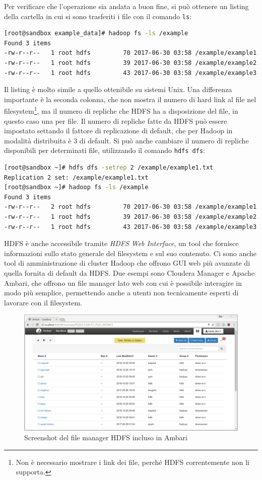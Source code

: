 \documentclass[italian,a4paper, twoside, 12pt]{report}
\begin{document}
Per verificare che l'operazione sia andata a buon fine, si può ottenere
un listing della cartella in cui si sono trasferiti i file con il
comando \lstinline!ls!:

\begin{lstlisting}[language=sh]
[root@sandbox example_data]# hadoop fs -ls /example
Found 3 items
-rw-r--r--   1 root hdfs         70 2017-06-30 03:58 /example/example1.txt
-rw-r--r--   1 root hdfs         39 2017-06-30 03:58 /example/example2.txt
-rw-r--r--   1 root hdfs         43 2017-06-30 03:58 /example/example3.txt
\end{lstlisting}

Il listing è molto simile a quello ottenibile su sistemi Unix. Una
differenza importante è la seconda colonna, che non mostra il numero di
hard link al file nel filesystem\footnote{Non è necessario mostrare i
  link dei file, perché HDFS correntemente non li supporta.}, ma il
numero di repliche che HDFS ha a disposizione del file, in questo caso
una per file. Il numero di repliche fatte da HDFS può essere impostato
settando il fattore di replicazione di default, che per Hadoop in
modalità distribuita è 3 di default. Si può anche cambiare il numero di
repliche disponibili per determinati file, utilizzando il comando
\lstinline!hdfs dfs!:

\begin{lstlisting}[language=sh]
[root@sandbox ~]# hdfs dfs -setrep 2 /example/example1.txt
Replication 2 set: /example/example1.txt
[root@sandbox ~]# hadoop fs -ls /example
Found 3 items
-rw-r--r--   2 root hdfs         70 2017-06-30 03:58 /example/example1.txt
-rw-r--r--   1 root hdfs         39 2017-06-30 03:58 /example/example2.txt
-rw-r--r--   1 root hdfs         43 2017-06-30 03:58 /example/example3.txt
\end{lstlisting}

HDFS è anche accessibile tramite \emph{HDFS Web Interface}, un tool che
fornisce informazioni sullo stato generale del filesystem e sul suo
contenuto. Ci sono anche tool di amministrazione di cluster Hadoop che
offrono GUI web più avanzate di quella fornita di default da HDFS. Due
esempi sono Cloudera Manager e Apache Ambari, che offrono un file
manager lato web con cui è possibile interagire in modo più semplice,
permettendo anche a utenti non tecnicamente esperti di lavorare con il
filesystem.

\begin{figure}
\centering
\includegraphics{img/ambari_hdfs.png}
\caption{Screenshot del file manager HDFS incluso in Ambari}
\end{figure}
\end{document}
